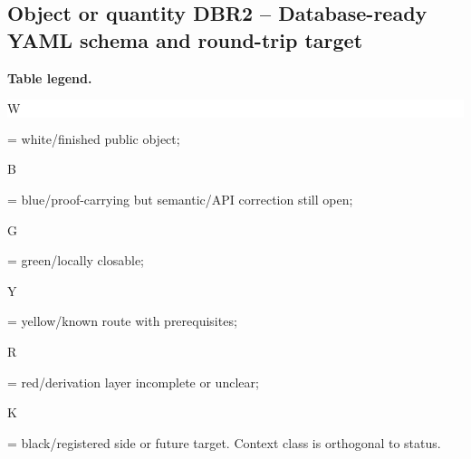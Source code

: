 \subsection*{Object or quantity DBR2 -- Database-ready YAML schema and round-trip target}
\hypertarget{objproof:DBR2}{}
\par\smallskip\noindent\begin{minipage}{0.99\linewidth}\footnotesize\raggedright\textbf{Table legend.} \colorbox{white}{\strut W} = white/finished public object; \colorbox{cyan!20}{\strut B} = blue/proof-carrying but semantic/API correction still open; \colorbox{green!18}{\strut G} = green/locally closable; \colorbox{yellow!25}{\strut Y} = yellow/known route with prerequisites; \colorbox{red!20}{\strut R} = red/derivation layer incomplete or unclear; \colorbox{black!18}{\strut K} = black/registered side or future target. Context class is orthogonal to status.\end{minipage}\par\vspace{0.25em}
